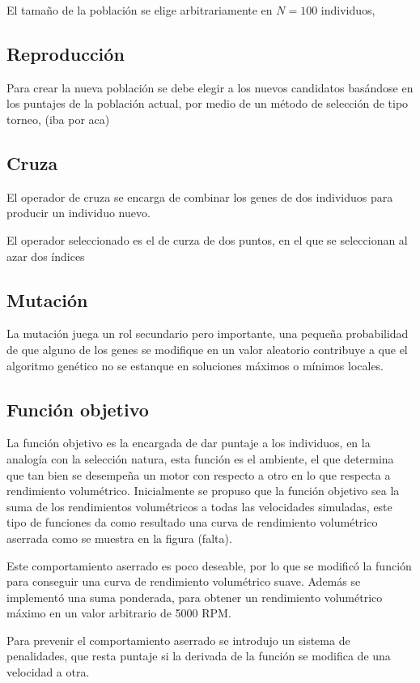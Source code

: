 El tamaño de la población se elige arbitrariamente en $N=100$ individuos, 

\subsection{Reproducción}

Para crear la nueva población se debe elegir a los nuevos candidatos basándose
en los puntajes de la población actual, por medio de un método de selección de
tipo torneo, (iba por aca)
%


\subsection{Cruza}
%
El operador de cruza se encarga de combinar los genes de dos individuos para
producir un individuo nuevo.

El operador seleccionado es el de curza de dos puntos, en el que se seleccionan
al azar dos índices


\subsection{Mutación}
%
La mutación juega un rol secundario pero importante, una pequeña probabilidad
de que alguno de los genes se modifique en un valor aleatorio contribuye a que
el algoritmo genético no se estanque en soluciones máximos o mínimos locales.

\subsection{Función objetivo}
%
La función objetivo es la encargada de dar puntaje a los individuos, en la
analogía con la selección natura, esta función es el ambiente, el que determina
que tan bien se desempeña un motor con respecto a otro en lo que respecta a
rendimiento volumétrico.
%
Inicialmente se propuso que la función objetivo sea la suma de los rendimientos
volumétricos a todas las velocidades simuladas, este tipo de funciones da como
resultado una curva de rendimiento volumétrico aserrada como se muestra en la
figura (falta).

Este comportamiento aserrado es poco deseable, por lo que se modificó la
función para conseguir una curva de rendimiento volumétrico suave.
%
Además se implementó una suma ponderada, para obtener un rendimiento
volumétrico máximo en un valor arbitrario de 5000 RPM.

Para prevenir el comportamiento aserrado se introdujo un sistema de
penalidades, que resta puntaje si la derivada de la función se modifica de una
velocidad a otra.



